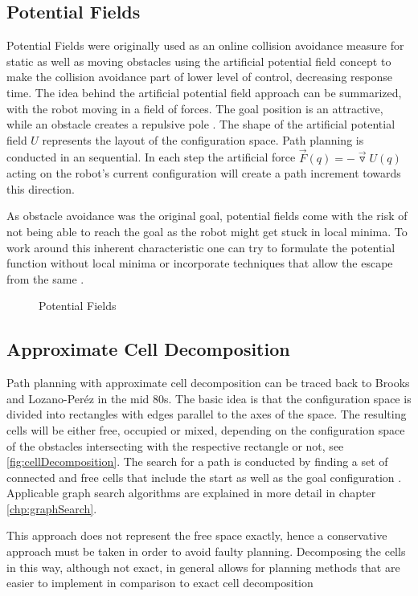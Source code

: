 \subsection{Potential Fields}
Potential Fields were originally used as an online collision avoidance measure for static as well as moving obstacles using the artificial potential field concept to make the collision avoidance part of lower level of control, decreasing response time. The idea behind the artificial potential field approach can be summarized, with the robot moving in a field of forces. The goal position is an attractive, while an obstacle creates a repulsive pole \cite{Khatib.1986}. The shape of the artificial potential field $U$ represents the layout of the configuration space. Path planning is conducted in an sequential. In each step the artificial force $\vec{F}(q) = -\vec{\triangledown}U(q)$ acting on the robot's current configuration will create a path increment towards this direction.

As obstacle avoidance was the original goal, potential fields come with the risk of not being able to reach the goal as the robot might get stuck in local minima. To work around this inherent characteristic one can try to formulate the potential function without local minima or incorporate techniques that allow the escape from the same \cite{Latombe.1991}.

\begin{figure}[h]
    \caption{Potential Fields}
    \label{fig:potentialFields}
\end{figure}

\subsection{Approximate Cell Decomposition}
Path planning with approximate cell decomposition can be traced back to Brooks and Lozano-Peréz in the mid 80s. The basic idea is that the configuration space is divided into rectangles with edges parallel to the axes of the space. The resulting cells will be either free, occupied or mixed, depending on the configuration space of the obstacles intersecting with the respective rectangle or not, see \ref{fig:cellDecomposition}. The search for a path is conducted by finding a set of connected and free cells that include the start as well as the goal configuration \cite{Brooks.1985}. Applicable graph search algorithms are explained in more detail in chapter \ref{chp:graphSearch}.

This approach does not represent the free space exactly, hence a conservative approach must be taken in order to avoid faulty planning. Decomposing the cells in this way, although not exact, in general allows for planning methods that are easier to implement in comparison to exact cell decomposition \cite{Latombe.1991}

